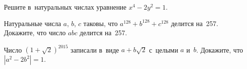 \begin{problems}
\item
Решите в~натуральных числах уравнение $x^4 - 2 y^2 = 1$.


\item
Натуральные числа $a$, $b$, $c$ таковы, что $a^{128} + b^{128} + c^{128}$
делится на~257.
Докажите, что число $a b c$ делится на~257.

\item
Число $(1 + \sqrt{2})^{2015}$ записали в~виде $a + b \sqrt{2}$ с~целыми
$a$ и~$b$.
Докажите, что $|a^2 - 2 b^2| = 1$.

\end{problems}

